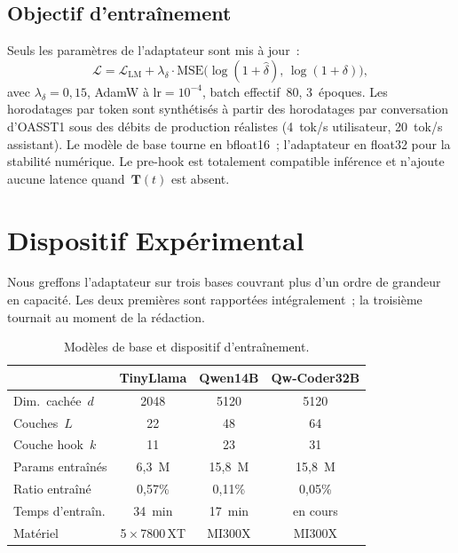 \documentclass[10pt,twocolumn,letterpaper]{article}
\begin{document}
\subsection{Objectif d'entraînement}

Seuls les paramètres de l'adaptateur sont mis à jour~:
\begin{equation}
\mathcal{L} = \mathcal{L}_{\text{LM}} + \lambda_\delta \cdot \text{MSE}\bigl(\log(1\!+\!\hat{\delta}),\,\log(1\!+\!\delta)\bigr),
\end{equation}
avec $\lambda_\delta = 0{,}15$, AdamW à $\text{lr}=10^{-4}$, batch effectif~80, 3~époques. Les horodatages par token sont synthétisés à partir des horodatages par conversation d'OASST1 sous des débits de production réalistes (4~tok/s utilisateur, 20~tok/s assistant). Le modèle de base tourne en bfloat16~; l'adaptateur en float32 pour la stabilité numérique. Le pre-hook est totalement compatible inférence et n'ajoute aucune latence quand~$\mathbf{T}(t)$ est absent.

\section{Dispositif Expérimental}

Nous greffons l'adaptateur sur trois bases couvrant plus d'un ordre de grandeur en capacité. Les deux premières sont rapportées intégralement~; la troisième tournait au moment de la rédaction.

\begin{table}[H]
\centering
\small
\caption{Modèles de base et dispositif d'entraînement.}
\label{tab:setup}
\begin{tabular}{@{}lccc@{}}
\toprule
 & \textbf{TinyLlama} & \textbf{Qwen14B} & \textbf{Qw-Coder32B} \\
\midrule
Dim.~cachée~$d$   & 2048        & 5120         & 5120 \\
Couches~$L$       & 22          & 48           & 64 \\
Couche hook~$k$   & 11          & 23           & 31 \\
Params entraînés  & 6{,}3~M     & 15{,}8~M     & 15{,}8~M \\
Ratio entraîné    & 0{,}57\%    & 0{,}11\%     & 0{,}05\% \\
Temps d'entraîn.  & 34~min      & 17~min       & en cours \\
Matériel          & 5\,$\times$\,7800\,XT & MI300X & MI300X \\
\bottomrule
\end{tabular}
\end{table}
\end{document}

